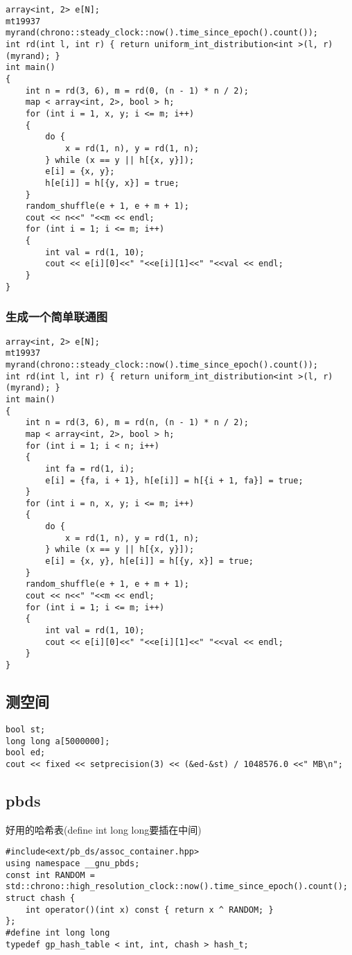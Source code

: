 \documentclass[a4paper, fontset=none]{ctexart}
\begin{document}
\begin{verbatim}
array<int, 2> e[N];
mt19937 myrand(chrono::steady_clock::now().time_since_epoch().count());
int rd(int l, int r) { return uniform_int_distribution<int >(l, r)(myrand); }
int main()
{
    int n = rd(3, 6), m = rd(0, (n - 1) * n / 2);
    map < array<int, 2>, bool > h;
    for (int i = 1, x, y; i <= m; i++)
    {
        do {
            x = rd(1, n), y = rd(1, n);
        } while (x == y || h[{x, y}]);
        e[i] = {x, y};
        h[e[i]] = h[{y, x}] = true;
    }
    random_shuffle(e + 1, e + m + 1);
    cout << n<<" "<<m << endl;
    for (int i = 1; i <= m; i++)
    {
        int val = rd(1, 10);
        cout << e[i][0]<<" "<<e[i][1]<<" "<<val << endl;
    }
}
\end{verbatim}
\subsubsection{生成一个简单联通图}

\begin{verbatim}
array<int, 2> e[N];
mt19937 myrand(chrono::steady_clock::now().time_since_epoch().count());
int rd(int l, int r) { return uniform_int_distribution<int >(l, r)(myrand); }
int main()
{
    int n = rd(3, 6), m = rd(n, (n - 1) * n / 2);
    map < array<int, 2>, bool > h;
    for (int i = 1; i < n; i++)
    {
        int fa = rd(1, i);
        e[i] = {fa, i + 1}, h[e[i]] = h[{i + 1, fa}] = true;
    }
    for (int i = n, x, y; i <= m; i++)
    {
        do {
            x = rd(1, n), y = rd(1, n);
        } while (x == y || h[{x, y}]);
        e[i] = {x, y}, h[e[i]] = h[{y, x}] = true;
    }
    random_shuffle(e + 1, e + m + 1);
    cout << n<<" "<<m << endl;
    for (int i = 1; i <= m; i++)
    {
        int val = rd(1, 10);
        cout << e[i][0]<<" "<<e[i][1]<<" "<<val << endl;
    }
}
\end{verbatim}
\subsection{测空间}

\begin{verbatim}
bool st;
long long a[5000000];
bool ed;
cout << fixed << setprecision(3) << (&ed-&st) / 1048576.0 <<" MB\n";
\end{verbatim}
\subsection{pbds}
好用的哈希表(define int long long要插在中间)
\begin{verbatim}
#include<ext/pb_ds/assoc_container.hpp>
using namespace __gnu_pbds;
const int RANDOM = std::chrono::high_resolution_clock::now().time_since_epoch().count();
struct chash {
    int operator()(int x) const { return x ^ RANDOM; }
};
#define int long long
typedef gp_hash_table < int, int, chash > hash_t;
\end{verbatim}
\end{document}
